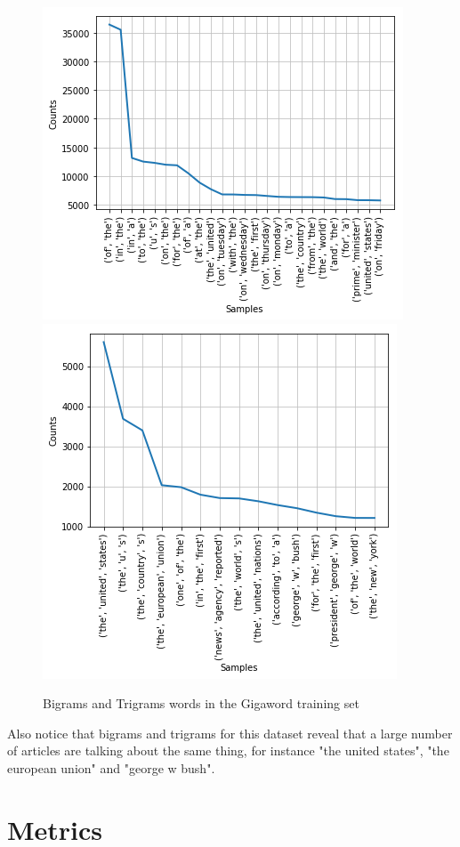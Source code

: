 \documentclass[a4paper]{article}
\begin{document}
\begin{figure}[!ht]
\includegraphics[width=0.8\columnwidth]{sr-eda-gigaword-bigrams}
\includegraphics[width=0.8\columnwidth]{sr-eda-gigaword-trigrams}
\centering
\caption{Bigrams and Trigrams words in the Gigaword training set}
\end{figure}

Also notice that bigrams and trigrams for this dataset reveal that a
large number of articles are talking about the same thing, for instance
"the united states", "the european union" and "george w bush".

\section{Metrics}
\label{sec:metrics}
\end{document}
